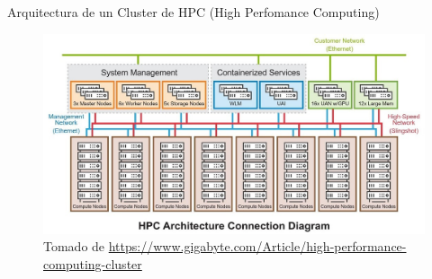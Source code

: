 \documentclass[11pt]{beamer}
\begin{document}
\begin{frame}{Arquitectura de un Cluster de HPC (High Perfomance Computing)}
	\vspace{-0.9cm}
	\begin{figure}
		\includegraphics[scale=0.42]{images/hpc_cluster}
		\caption{Tomado de \url{https://www.gigabyte.com/Article/high-performance-computing-cluster}}
	\end{figure}
\end{frame}
\end{document}
